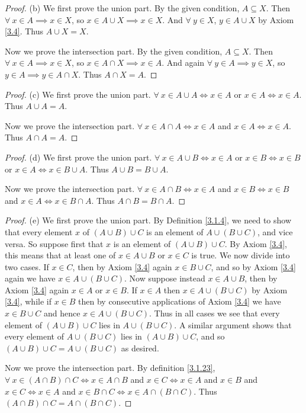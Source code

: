 \begin{proof}{(b)}
We first prove the union part.
By the given condition, \(A \subseteq X\).
Then \(\forall\ x \in A \implies x \in X\), so \(x \in A \cup X \implies x \in X\).
And \(\forall\ y \in X\), \(y \in A \cup X\) by Axiom \ref{3.4}.
Thus \(A \cup X = X\).

Now we prove the intersection part.
By the given condition, \(A \subseteq X\).
Then \(\forall\ x \in A \implies x \in X\), so \(x \in A \cap X \implies x \in A\).
And again \(\forall\ y \in A \implies y \in X\), so \(y \in A \implies y \in A \cap X\).
Thus \(A \cap X = A\).
\end{proof}

\begin{proof}{(c)}
We first prove the union part.
\(\forall\ x \in A \cup A \iff x \in A\) or \(x \in A \iff x \in A\).
Thus \(A \cup A = A\).

Now we prove the intersection part.
\(\forall\ x \in A \cap A \iff x \in A\) and \(x \in A \iff x \in A\).
Thus \(A \cap A = A\).
\end{proof}

\begin{proof}{(d)}
We first prove the union part.
\(\forall\ x \in A \cup B \iff x \in A\) or \(x \in B \iff x \in B\) or \(x \in A \iff x \in B \cup A\).
Thus \(A \cup B = B \cup A\).

Now we prove the intersection part.
\(\forall\ x \in A \cap B \iff x \in A\) and \(x \in B \iff x \in B\) and \(x \in A \iff x \in B \cap A\).
Thus \(A \cap B = B \cap A\).
\end{proof}

\begin{proof}{(e)}
We first prove the union part.
By Definition \ref{3.1.4}, we need to show that every element \(x\) of \((A \cup B) \cup C\) is an element of \(A \cup (B \cup C)\), and vice versa.
So suppose first that \(x\) is an element of \((A \cup B) \cup C\).
By Axiom \ref{3.4}, this means that at least one of \(x \in A \cup B\) or \(x \in C\) is true.
We now divide into two cases.
If \(x \in C\), then by Axiom \ref{3.4} again \(x \in B \cup C\), and so by Axiom \ref{3.4} again we have \(x \in A \cup (B \cup C)\).
Now suppose instead \(x \in A \cup B\), then by Axiom \ref{3.4} again \(x \in A\) or \(x \in B\).
If \(x \in A\) then \(x \in A \cup (B \cup C)\) by Axiom \ref{3.4}, while if \(x \in B\) then by consecutive applications of Axiom \ref{3.4} we have \(x \in B \cup C\) and hence \(x \in A \cup (B \cup C)\).
Thus in all cases we see that every element of \((A \cup B) \cup C\) lies in \(A \cup (B \cup C)\).
A similar argument shows that every element of \(A \cup (B \cup C)\) lies in \((A \cup B) \cup C\), and so \((A \cup B) \cup C = A \cup (B \cup C) \) as desired.

Now we prove the intersection part.
By definition \ref{3.1.23}, \(\forall\ x \in (A \cap B) \cap C \iff x \in A \cap B \) and \(x \in C \iff x \in A\) and \(x \in B\) and \(x \in C \iff x \in A\) and \(x \in B \cap C \iff x \in A \cap (B \cap C)\).
Thus \((A \cap B) \cap C = A \cap (B \cap C)\).
\end{proof}

